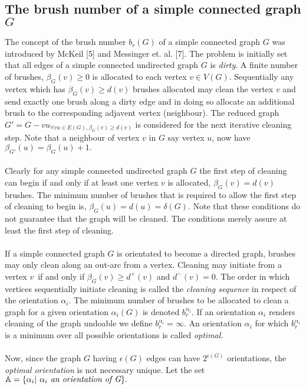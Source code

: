 \documentclass[11pt]{article}
\numberwithin{equation}{section}
\begin{document}
{\subsection{The brush number of a simple connected graph $G$}
\noindent The concept of the brush number $b_r(G)$ of a simple connected graph $G$ was introduced by McKeil [5] and Messinger et. al. [7]. The problem is initially set that all edges of a simple connected undirected graph $G$ is \emph{dirty}. A finite number of brushes, $\beta_G(v) \geq 0$ is allocated to each vertex $v \in V(G).$ Sequentially any vertex which has $\beta_G(v) \geq d(v)$ brushes allocated may clean the vertex $v$ and send exactly one brush along a dirty edge and in doing so allocate an additional brush to the corresponding adjavent vertex (neighbour). The reduced graph $G' = G - vu_{\forall vu \in E(G), \beta_G(v) \geq d(v)}$ is considered for the next iterative cleaning step. Note that a neighbour of vertex $v$ in $G$ say vertex $u$, now have $\beta_{G'}(u) =\beta_G(u) + 1.$\\ \\
\noindent Clearly for any simple connected undirected graph $G$ the first step of cleaning can begin if and only if at least one vertex $v$ is allocated, $\beta_G(v)= d(v)$ brushes. The minimum number of brushes that is required to allow the first step of cleaning to begin is, $\beta_G(u) = d(u) = \delta(G).$ Note that these conditions do not guarantee that the graph will be cleaned. The conditions merely assure at least the first step of cleaning.\\ \\
\noindent If a simple connected graph $G$ is orientated to become a directed graph, brushes may only clean along an out-arc from a vertex. Cleaning may initiate from a vertex $v$\ if and only if $\beta_G(v) \geq d^+(v)$ and $d^-(v) =0.$ The order in which vertices sequentially initiate cleaning is called the \emph{cleaning sequence} in respect of the orientation $\alpha_i$. The minimum number of brushes to be allocated to clean a graph for a given orientation $\alpha_i(G)$ is denoted $b_r^{\alpha_i}$. If an orientation $\alpha_i$ renders cleaning of the graph undoable we define $b_r^{\alpha_i} = \infty.$ An orientation $\alpha_i$ for which $b_r^{\alpha_i}$ is a minimum over all possible orientations is called \emph{optimal}.\\ \\
Now, since the graph $G$ having $\epsilon(G)$ edges can have $2^{\epsilon(G)}$ orientations, the \emph{optimal orientation} is not necessary unique. Let the set $\Bbb A =\{\alpha_i|\emph{ $\alpha_i$ an orientation of G}\}.$
}
\end{document}
